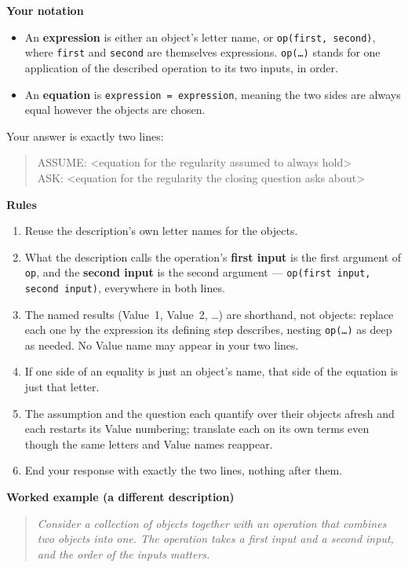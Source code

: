 \documentclass{article}
\begin{document}
\begin{promptbox}
\vspace{0.4em}
\noindent\textbf{Your notation}
\begin{itemize}
  \item An \textbf{expression} is either an object's letter name, or
    \texttt{op(first, second)}, where \texttt{first} and \texttt{second} are
    themselves expressions. \texttt{op(\ldots)} stands for one application of
    the described operation to its two inputs, in order.
  \item An \textbf{equation} is \texttt{expression = expression}, meaning the
    two sides are always equal however the objects are chosen.
\end{itemize}

Your answer is exactly two lines:
\begin{quote}\ttfamily
ASSUME: <equation for the regularity assumed to always hold>\\
ASK: <equation for the regularity the closing question asks about>
\end{quote}

\vspace{0.4em}
\noindent\textbf{Rules}
\begin{enumerate}
  \item Reuse the description's own letter names for the objects.
  \item What the description calls the operation's \textbf{first input} is the
    first argument of \texttt{op}, and the \textbf{second input} is the second
    argument --- \texttt{op(first input, second input)}, everywhere in both
    lines.
  \item The named results (Value~1, Value~2, \ldots) are shorthand, not
    objects: replace each one by the expression its defining step describes,
    nesting \texttt{op(\ldots)} as deep as needed. No Value name may appear in
    your two lines.
  \item If one side of an equality is just an object's name, that side of the
    equation is just that letter.
  \item The assumption and the question each quantify over their objects
    afresh and each restarts its Value numbering; translate each on its own
    terms even though the same letters and Value names reappear.
  \item End your response with exactly the two lines, nothing after them.
\end{enumerate}

\vspace{0.4em}
\noindent\textbf{Worked example (a different description)}
\begin{quote}\itshape
Consider a collection of objects together with an operation that combines
two objects into one. The operation takes a first input and a second
input, and the order of the inputs matters.


\end{quote}
\end{promptbox}
\end{document}
